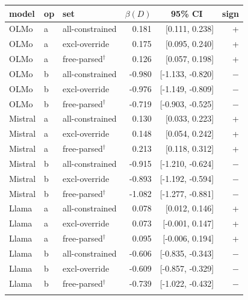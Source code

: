 \begin{tabular}{lll rr r}
\toprule
model & op & set & \multicolumn{1}{c}{$\beta(D)$} & \multicolumn{1}{c}{95\% CI} & sign \\
\midrule
OLMo & a & all-constrained & 0.181 & [0.111, 0.238] & + \\
OLMo & a & excl-override & 0.175 & [0.095, 0.240] & + \\
OLMo & a & free-parsed$^{\dagger}$ & 0.126 & [0.057, 0.198] & + \\
\addlinespace
OLMo & b & all-constrained & -0.980 & [-1.133, -0.820] & $-$ \\
OLMo & b & excl-override & -0.976 & [-1.149, -0.809] & $-$ \\
OLMo & b & free-parsed$^{\dagger}$ & -0.719 & [-0.903, -0.525] & $-$ \\
\addlinespace
Mistral & a & all-constrained & 0.130 & [0.033, 0.223] & + \\
Mistral & a & excl-override & 0.148 & [0.054, 0.242] & + \\
Mistral & a & free-parsed$^{\dagger}$ & 0.213 & [0.118, 0.312] & + \\
\addlinespace
Mistral & b & all-constrained & -0.915 & [-1.210, -0.624] & $-$ \\
Mistral & b & excl-override & -0.893 & [-1.192, -0.594] & $-$ \\
Mistral & b & free-parsed$^{\dagger}$ & -1.082 & [-1.277, -0.881] & $-$ \\
\addlinespace
Llama & a & all-constrained & 0.078 & [0.012, 0.146] & + \\
Llama & a & excl-override & 0.073 & [-0.001, 0.147] & + \\
Llama & a & free-parsed$^{\dagger}$ & 0.095 & [-0.006, 0.194] & + \\
\addlinespace
Llama & b & all-constrained & -0.606 & [-0.835, -0.343] & $-$ \\
Llama & b & excl-override & -0.609 & [-0.857, -0.329] & $-$ \\
Llama & b & free-parsed$^{\dagger}$ & -0.739 & [-1.022, -0.432] & $-$ \\
\addlinespace
\bottomrule
\end{tabular}
